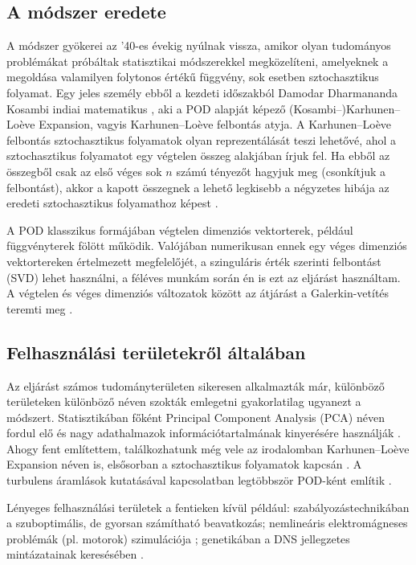         \subsection{A módszer eredete}
            A módszer gyökerei az '40-es évekig nyúlnak vissza, amikor olyan tudományos problémákat próbáltak statisztikai módszerekkel megközelíteni, amelyeknek a megoldása valamilyen folytonos értékű függvény, sok esetben sztochasztikus folyamat. Egy jeles személy ebből a kezdeti időszakból Damodar Dharmananda Kosambi indiai matematikus \cite{Kosambi11}, aki a POD alapját képező (Kosambi--)Karhunen–Lo\`eve Expansion, vagyis Karhunen–Lo\`eve felbontás atyja. A Karhunen–Lo\`eve felbontás sztochasztikus folyamatok olyan reprezentálását teszi lehetővé, ahol a sztochasztikus folyamatot egy végtelen összeg alakjában írjuk fel. Ha ebből az összegből csak az első véges sok $n$ számú tényezőt hagyjuk meg (csonkítjuk a felbontást), akkor a kapott összegnek a lehető legkisebb a négyzetes hibája az eredeti sztochasztikus folyamathoz képest \cite{Aadithya18}.
            \par
            A POD klasszikus formájában végtelen dimenziós vektorterek, például függvényterek fölött működik. Valójában numerikusan ennek egy véges dimenziós vektortereken értelmezett megfelelőjét, a szinguláris érték szerinti felbontást (SVD) lehet használni, a féléves munkám során én is ezt az eljárást használtam. A végtelen és véges dimenziós változatok között az átjárást a Galerkin-vetítés teremti meg \cite{Holmes12}.
        \subsection{Felhasználási területekről általában}
            Az eljárást számos tudományterületen sikeresen alkalmazták már, különböző területeken különböző néven szokták emlegetni gyakorlatilag ugyanezt a módszert. Statisztikában főként Principal Component Analysis (PCA) néven fordul elő és nagy adathalmazok információtartalmának kinyerésére használják \cite{Jolliffe16}. Ahogy fent említettem, találkozhatunk még vele az irodalomban Karhunen–Lo\`eve Expansion néven is, elsősorban a sztochasztikus folyamatok kapcsán \cite{Aadithya18}. A turbulens áramlások kutatásával kapcsolatban legtöbbször POD-ként említik \cite{Sirovich}.
            \par
            Lényeges felhasználási területek a fentieken kívül például: szabályozástechnikában a szuboptimális, de gyorsan számítható beavatkozás; nemlineáris elektromágneses problémák (pl. motorok) szimulációja \cite{Henneron14}; genetikában a DNS jellegzetes mintázatainak keresésében \cite{Chicco15}.
